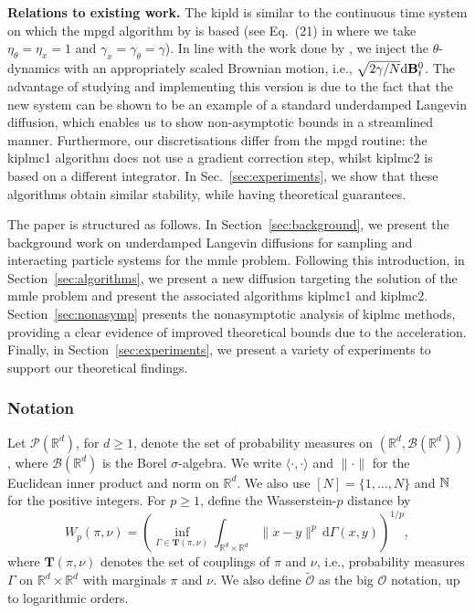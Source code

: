 \noindent\textbf{Relations to existing work.} The \gls*{kipld} is similar to the continuous time system on which the \gls*{mpgd} algorithm by \citep{lim2023momentum} is based (see Eq.~(21) in \citep{lim2023momentum} where we take $\eta_\theta = \eta_x = 1$ and $\gamma_x = \gamma_\theta = \gamma$). In line with the work done by \citep{akyildiz2025interacting}, we inject the $\theta$-dynamics with an appropriately scaled Brownian motion, i.e., $\sqrt{2\gamma/N} {\mathrm d} {\mathbf B}^0_t$. The advantage of studying and implementing this version is due to the fact that the new system can be shown to be an example of a standard underdamped Langevin diffusion, which enables us to show non-asymptotic bounds in a streamlined manner. Furthermore, our discretisations differ from the \gls*{mpgd} routine: the \gls*{kiplmc1} algorithm does not use a gradient correction step, whilst \gls*{kiplmc2} is based on a different integrator. In Sec.~\ref{sec:experiments}, we show that these algorithms obtain similar stability, while having theoretical guarantees. 

The paper is structured as follows. In Section~\ref{sec:background}, we present the background work on underdamped Langevin diffusions for sampling and interacting particle systems for the \gls*{mmle} problem. Following this introduction, in Section~\ref{sec:algorithms}, we present a new diffusion targeting the solution of the \gls*{mmle} problem and present the associated algorithms \gls*{kiplmc1} and \gls*{kiplmc2}. Section~\ref{sec:nonasymp} presents the nonasymptotic analysis of \gls*{kiplmc} methods, providing a clear evidence of improved theoretical bounds due to the acceleration. Finally, in Section~\ref{sec:experiments}, we present a variety of experiments to support our theoretical findings.

\subsubsection*{Notation}
Let $\mathcal{P}(\mathbb{R}^d)$, for $d\geq 1$, denote the set of probability measures on $(\mathbb{R}^d,\mathcal{B}(\mathbb{R}^d))$, where $\mathcal{B}(\mathbb{R}^d)$ is the Borel $\sigma$-algebra. We write $\langle\cdot,\cdot\rangle$ and $\|\cdot\|$ for the Euclidean inner product and norm on $\mathbb{R}^d$. We also use $[N]=\{1,\dots,N\}$ and ${\mathbb N}$ for the positive integers. For $p\geq 1$, define the Wasserstein-$p$ distance by
\[
W_p(\pi,\nu) = \left(\inf_{\Gamma\in \mathbf{T}(\pi, \nu)} \int_{\mathbb{R}^d\times\mathbb{R}^d} \|x-y\|^p\,\mathrm{d}\Gamma(x,y)\right)^{1/p},
\]
where $\mathbf{T}(\pi,\nu)$ denotes the set of couplings of $\pi$ and $\nu$, i.e., probability measures $\Gamma$ on $\mathbb{R}^d\times\mathbb{R}^d$ with marginals $\pi$ and $\nu$. We also define $\widetilde{\mathcal{O}}$ as the big $\mathcal{O}$ notation, up to logarithmic orders.
